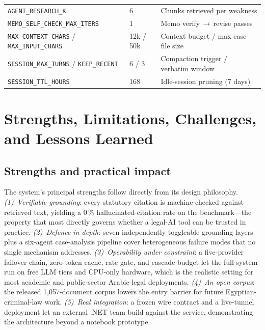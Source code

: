 \documentclass[final,1p,times]{elsarticle}
\begin{document}
\begin{table}[!htb]
\begin{tabular}{L{4.6cm} L{2.2cm} L{7.0cm}}
\texttt{AGENT\_RESEARCH\_K} & 6 & Chunks retrieved per weakness \\
\texttt{MEMO\_SELF\_CHECK\_MAX\_ITERS} & 1 & Memo verify\,$\rightarrow$\,revise passes \\
\texttt{MAX\_CONTEXT\_CHARS} / \texttt{MAX\_INPUT\_CHARS} & 12k / 50k & Context budget / max case-file size \\
\texttt{SESSION\_MAX\_TURNS} / \texttt{KEEP\_RECENT} & 6 / 3 & Compaction trigger / verbatim window \\
\texttt{SESSION\_TTL\_HOURS} & 168 & Idle-session pruning (7 days) \\
\bottomrule
\end{tabular}
\end{table}

\section{Strengths, Limitations, Challenges, and Lessons Learned}\label{sec:limits}

\subsection{Strengths and practical impact}

The system's principal strengths follow directly from its design philosophy.
\emph{(1)~Verifiable grounding}: every statutory citation is machine-checked
against retrieved text, yielding a 0\,\% hallucinated-citation rate on the
benchmark---the property that most directly governs whether a legal-AI tool can be
trusted in practice. \emph{(2)~Defence in depth}: seven independently-toggleable
grounding layers plus a six-agent case-analysis pipeline cover heterogeneous
failure modes that no single mechanism addresses. \emph{(3)~Operability under
constraint}: a five-provider failover chain, zero-token cache, rate gate, and
cascade budget let the full system run on free LLM tiers and CPU-only hardware,
which is the realistic setting for most academic and public-sector Arabic-legal
deployments. \emph{(4)~An open corpus}: the released 1{,}057-document corpus
lowers the entry barrier for future Egyptian-criminal-law work. \emph{(5)~Real
integration}: a frozen wire contract and a live-tunnel deployment let an external
.NET team build against the service, demonstrating the architecture beyond a
notebook prototype.
\end{document}
